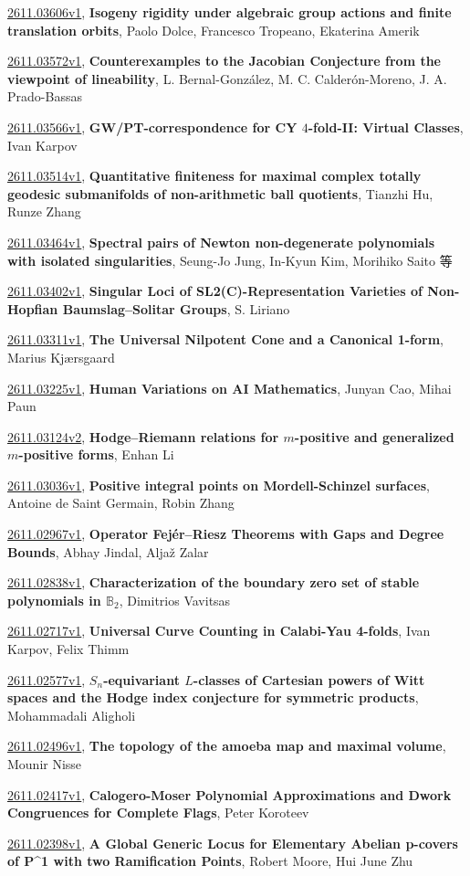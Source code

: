 \documentclass[9pt, a4paper]{article}
\theoremstyle{plain}
\theoremstyle{definition}
\theoremstyle{remark}
\newcommand{\arxiv}[3]{\href{https://arxiv.org/abs/#1}{#1}, \textbf{\textcolor{arxivblue}{#2}}, #3}
\begin{document}
\arxiv{2611.03606v1}{Isogeny rigidity under algebraic group actions and finite translation orbits}{Paolo Dolce, Francesco Tropeano, Ekaterina Amerik}

\arxiv{2611.03572v1}{Counterexamples to the Jacobian Conjecture from the viewpoint of lineability}{L. Bernal-González, M. C. Calderón-Moreno, J. A. Prado-Bassas}

\arxiv{2611.03566v1}{GW/PT-correspondence for CY $4$-fold-II: Virtual Classes}{Ivan Karpov}

\arxiv{2611.03514v1}{Quantitative finiteness for maximal complex totally geodesic submanifolds of non-arithmetic ball quotients}{Tianzhi Hu, Runze Zhang}

\arxiv{2611.03464v1}{Spectral pairs of Newton non-degenerate polynomials with isolated singularities}{Seung-Jo Jung, In-Kyun Kim, Morihiko Saito 等}

\arxiv{2611.03402v1}{Singular Loci of SL2(C)-Representation Varieties of Non-Hopfian Baumslag--Solitar Groups}{S. Liriano}

\arxiv{2611.03311v1}{The Universal Nilpotent Cone and a Canonical 1-form}{Marius Kjærsgaard}

\arxiv{2611.03225v1}{Human Variations on AI Mathematics}{Junyan Cao, Mihai Paun}

\arxiv{2611.03124v2}{Hodge--Riemann relations for $m$-positive and generalized $m$-positive forms}{Enhan Li}

\arxiv{2611.03036v1}{Positive integral points on Mordell-Schinzel surfaces}{Antoine de Saint Germain, Robin Zhang}

\arxiv{2611.02967v1}{Operator Fejér--Riesz Theorems with Gaps and Degree Bounds}{Abhay Jindal, Aljaž Zalar}

\arxiv{2611.02838v1}{Characterization of the boundary zero set of stable polynomials in $\mathbb B_2$}{Dimitrios Vavitsas}

\arxiv{2611.02717v1}{Universal Curve Counting in Calabi-Yau 4-folds}{Ivan Karpov, Felix Thimm}

\arxiv{2611.02577v1}{$S_n$-equivariant $L$-classes of Cartesian powers of Witt spaces and the Hodge index conjecture for symmetric products}{Mohammadali Aligholi}

\arxiv{2611.02496v1}{The topology of the amoeba map and maximal volume}{Mounir Nisse}

\arxiv{2611.02417v1}{Calogero-Moser Polynomial Approximations and Dwork Congruences for Complete Flags}{Peter Koroteev}

\arxiv{2611.02398v1}{A Global Generic Locus for Elementary Abelian p-covers of P^1 with two Ramification Points}{Robert Moore, Hui June Zhu}
\end{document}
